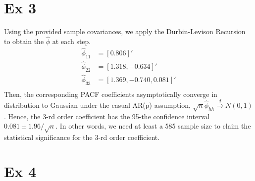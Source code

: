 \documentclass[11pt, letterpaper]{article}
\begin{document}
\section{Ex 3}
Using the provided sample covariances, we apply the Durbin-Levison Recursion to obtain the $\hat{\phi}$ at each step.
\begin{align*}
    \hat{\phi}_{11} &= [0.806]' \\
    \hat{\phi}_{22} &= [1.318, -0.634]' \\
    \hat{\phi}_{33} &= [1.369, -0.740, 0.081]' \\
\end{align*}
Then, the corresponding PACF coefficients asymptotically converge in distribution to Gaussian under the casual AR(p) assumption, $\sqrt{n}\hat{\phi}_{hh} \xrightarrow{d} N(0,1)$. Hence, the 3-rd order coefficient has the 95-the confidence interval $0.081 \pm 1.96/\sqrt{n}$. In other words, we need at least a 585 sample size to claim the statistical significance for the 3-rd order coefficient.

\section{Ex 4}
\end{document}
